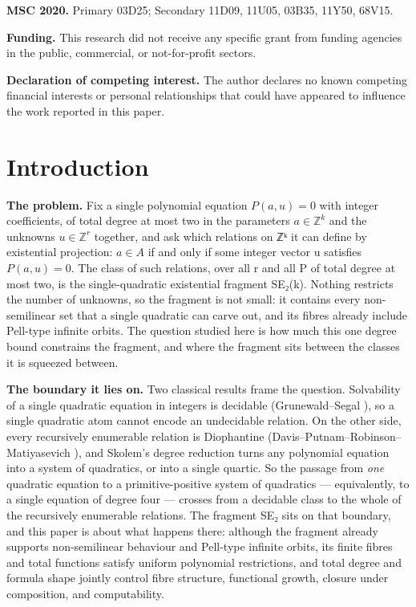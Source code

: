 \documentclass[11pt]{article}
\theoremstyle{plain}
\theoremstyle{definition}
\theoremstyle{remark}
\theoremstyle{plain}
\theoremstyle{definition}
\theoremstyle{remark}
\theoremstyle{plain}
\theoremstyle{definition}
\theoremstyle{remark}
\begin{document}
\noindent\textbf{MSC 2020.} Primary 03D25; Secondary 11D09, 11U05, 03B35, 11Y50, 68V15.

\noindent\textbf{Funding.} This research did not receive any specific grant from funding agencies in the public, commercial, or not-for-profit sectors.

\noindent\textbf{Declaration of competing interest.} The author declares no known competing financial interests or personal relationships that could have appeared to influence the work reported in this paper.

\section*{Introduction}

\textbf{The problem.} Fix a single polynomial equation $P(a, u) = 0$ with integer coefficients, of total degree at most two in the parameters $a ∈ ℤ^{k}$ and the unknowns $u ∈ ℤ^{r}$ together, and ask which relations on ℤᵏ it can define by existential projection: $a ∈ A$ if and only if some integer vector u satisfies $P(a, u) = 0$. The class of such relations, over all r and all P of total degree at most two, is the single-quadratic existential fragment SE₂(k). Nothing restricts the number of unknowns, so the fragment is not small: it contains every non-semilinear set that a single quadratic can carve out, and its fibres already include Pell-type infinite orbits. The question studied here is how much this one degree bound constrains the fragment, and where the fragment sits between the classes it is squeezed between.

\textbf{The boundary it lies on.} Two classical results frame the question. Solvability of a single quadratic equation in integers is decidable (Grunewald–Segal \cite{GS04}), so a single quadratic atom cannot encode an undecidable relation. On the other side, every recursively enumerable relation is Diophantine (Davis–Putnam–Robinson–Matiyasevich \cite{DPR61,Mat70}), and Skolem's degree reduction \cite{Sko38} turns any polynomial equation into a system of quadratics, or into a single quartic. So the passage from \emph{one} quadratic equation to a primitive-positive system of quadratics — equivalently, to a single equation of degree four — crosses from a decidable class to the whole of the recursively enumerable relations. The fragment SE₂ sits on that boundary, and this paper is about what happens there: although the fragment already supports non-semilinear behaviour and Pell-type infinite orbits, its finite fibres and total functions satisfy uniform polynomial restrictions, and total degree and formula shape jointly control fibre structure, functional growth, closure under composition, and computability.
\end{document}
